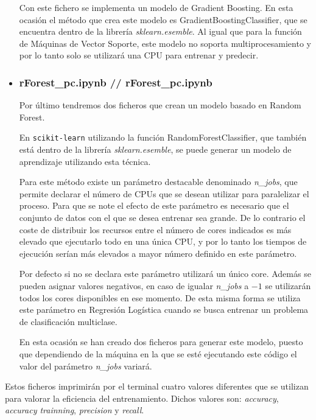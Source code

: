 \documentclass[a4paper, 12pt]{book}
\begin{document}
\begin{itemize}
Con este fichero se implementa un modelo de Gradient Boosting. En esta ocasión el método que crea este modelo es GradientBoostingClassifier\cite{GradientTreeBDoc}, que se encuentra dentro de la librería \textit{sklearn.esemble}. Al igual que para la función de Máquinas de Vector Soporte, este modelo no soporta multiprocesamiento y por lo tanto solo se utilizará una CPU para entrenar y predecir. 

\item \subsubsection{rForest\_pc.ipynb // rForest\_pc.ipynb} 
\label{subsubsub:rForest}

Por último tendremos dos ficheros que crean un modelo basado en Random Forest.

En \texttt{scikit-learn} utilizando la función RandomForestClassifier\cite{RandomForestDoc}, que también está dentro de la librería \textit{sklearn.esemble}, se puede generar un modelo de aprendizaje utilizando esta técnica.

Para este método existe un parámetro destacable denominado \textit{n\_jobs}, que permite declarar el número de CPUs que se desean utilizar para paralelizar el proceso. Para que se note el efecto de este parámetro es necesario que el conjunto de datos con el que se desea entrenar sea grande. De lo contrario el coste de distribuir los recursos entre el número de cores indicados es más elevado que ejecutarlo todo en una única CPU, y por lo tanto los tiempos de ejecución serían más elevados a mayor número definido en este parámetro.

Por defecto si no se declara este parámetro utilizará un único core. Además se pueden asignar valores negativos, en caso de igualar \textit{n\_jobs} a $-1$ se utilizarán todos los cores disponibles en ese momento. De esta misma forma se utiliza este parámetro en Regresión Logística cuando se busca entrenar un problema de clasificación multiclase.

En esta ocasión se han creado dos ficheros para generar este modelo, puesto que dependiendo de la máquina en la que se esté ejecutando este código el valor del parámetro \textit{n\_jobs} variará. 

\end{itemize}

Estos ficheros imprimirán por el terminal cuatro valores diferentes que se utilizan para valorar la eficiencia del entrenamiento. Dichos valores son: \textit{accuracy}, \textit{accuracy trainning}, \textit{precision} y \textit{recall}. 
\end{document}
